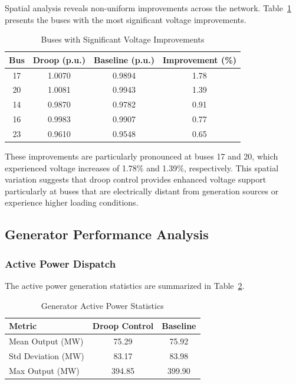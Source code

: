 Spatial analysis reveals non-uniform improvements across the network. Table~\ref{tab:bus_improvements} presents the buses with the most significant voltage improvements.

\begin{table}[htbp]
\centering
\caption{Buses with Significant Voltage Improvements}
\label{tab:bus_improvements}
\begin{tabular}{cccc}
\hline
\textbf{Bus} & \textbf{Droop (p.u.)} & \textbf{Baseline (p.u.)} & \textbf{Improvement (\%)} \\
\hline
17 & 1.0070 & 0.9894 & 1.78 \\
20 & 1.0081 & 0.9943 & 1.39 \\
14 & 0.9870 & 0.9782 & 0.91 \\
16 & 0.9983 & 0.9907 & 0.77 \\
23 & 0.9610 & 0.9548 & 0.65 \\
\hline
\end{tabular}
\end{table}

These improvements are particularly pronounced at buses 17 and 20, which experienced voltage increases of 1.78\% and 1.39\%, respectively. This spatial variation suggests that droop control provides enhanced voltage support particularly at buses that are electrically distant from generation sources or experience higher loading conditions.

\subsection{Generator Performance Analysis}

\subsubsection{Active Power Dispatch}

The active power generation statistics are summarized in Table~\ref{tab:gen_power}.

\begin{table}[htbp]
\centering
\caption{Generator Active Power Statistics}
\label{tab:gen_power}
\begin{tabular}{lcc}
\hline
\textbf{Metric} & \textbf{Droop Control} & \textbf{Baseline} \\
\hline
Mean Output (MW) & 75.29 & 75.92 \\
Std Deviation (MW) & 83.17 & 83.98 \\
Max Output (MW) & 394.85 & 399.90 \\
\hline
\end{tabular}
\end{table}

